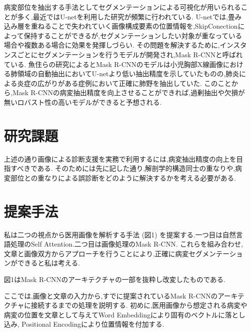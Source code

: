 \documentclass[a4j,10pt, twocolumn]{jarticle}
\begin{document}
病変部位を抽出する手法としてセグメンテーションによる可視化が用いられることが多く,最近ではU-netを利用した研究が頻繁に行われている\cite{近藤堅司2018u}.
U-netでは,畳み込み層を重ねることで失われていく画像構成要素の位置情報を,SkipConectionによって保持することができるが,セグメンテーションしたい対象が重なっている場合や複数ある場合に効果を発揮しづらい.
その問題を解決するために,インスタンスごとにセグメンテーションを行うモデルが開発され,Mask R-CNNと呼ばれている\cite{he2017mask}.
魚住らの研究によるとMask R-CNNのモデルは小児胸部X線画像における肺領域の自動抽出においてU-netより低い抽出精度を示していたものの,肺炎による炎症の広がりがある症例において正確に肺野を抽出していた\cite{魚住春日2020mask}.
このことから,Mask R-CNNの病変抽出精度を向上させることができれば,過剰抽出や欠損が無いロバスト性の高いモデルができると予想される.

\section{研究課題}
上述の通り画像による診断支援を実務で利用するには,病変抽出精度の向上を目指すべきである.
そのためには先に記した通り,解剖学的構造同士の重なりや,病変部位との重なりによる誤診断をどのように解決するかを考える必要がある.

\section{提案手法}
私は二つの視点から医用画像を解析する手法 (図1) を提案する.一つ目は自然言語処理のSelf Attention\cite{vaswani2017attention}.二つ目は画像処理のMask R-CNN.
これらを組み合わせ,文章と画像双方からアプローチを行うことにより,正確に病変セグメンテーションができると私は考える.

図1はMask R-CNNのアーキテクチャの一部を抜粋し改変したものである.

ここでは,画像と文章の入力から,すでに提案されているMask R-CNNのアーキテクチャに接続するまでの処理を説明する.
初めに,医用画像から想定される病変や病変の位置を文章として与えてWord Embedding\cite{堅山耀太郎2017word}により固有のベクトルに落とし込み, Positional Encodingにより位置情報を付加する.

\end{document}
